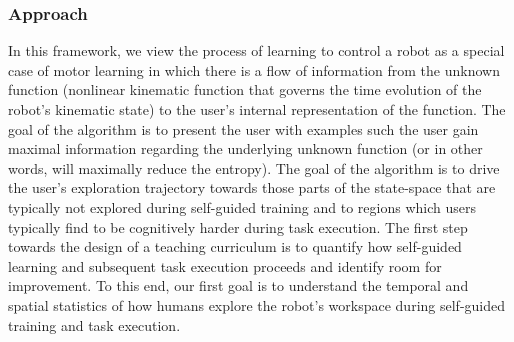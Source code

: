 \documentclass[12pt]{article}
\begin{document}
%	
%
%
%
%
%
%
\subsubsection{Approach}\label{sssec:learning_approach}
In this framework, we view the process of learning to control a robot as a special case of motor learning in which there is a flow of information from the unknown function (nonlinear kinematic function that governs the time evolution of the robot's kinematic state) to the user's internal representation of the function. The goal of the algorithm is to present the user with examples such the user gain maximal information regarding the underlying unknown function (or in other words, will maximally reduce the entropy). The goal of the algorithm is to drive the user's exploration trajectory towards those parts of the state-space that are typically not explored during self-guided training  and to regions which users typically find to be cognitively harder during task execution.
The first step towards the design of a teaching curriculum is to quantify how self-guided learning and subsequent task execution proceeds and identify room for improvement. To this end, our first goal is to understand the temporal and spatial statistics of how humans explore the robot's workspace during self-guided training and task execution. 
\end{document}
